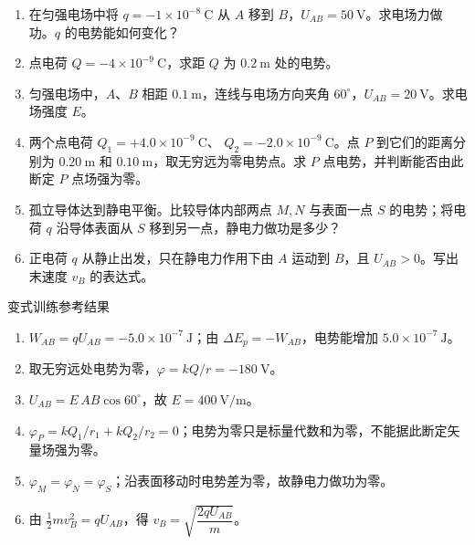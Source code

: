 \begin{enumerate}
  \item 在匀强电场中将 $q = -1 \times 10^{-8}\ \mathrm{C}$ 从 $A$ 移到 $B$，$U_{AB} = 50\ \mathrm{V}$。求电场力做功。$q$ 的电势能如何变化？

  \item 点电荷 $Q = -4 \times 10^{-9}\ \mathrm{C}$，求距 $Q$ 为 $0.2\ \mathrm{m}$ 处的电势。

  \item 匀强电场中，$A$、$B$ 相距 $0.1\ \mathrm{m}$，连线与电场方向夹角 $60^\circ$，$U_{AB} = 20\ \mathrm{V}$。求电场强度 $E$。
  \begin{center}
  
  \end{center}

  \item 两个点电荷 $Q_1=+4.0\times10^{-9}\ \mathrm C$、
  $Q_2=-2.0\times10^{-9}\ \mathrm C$。点 $P$ 到它们的距离分别为
  $0.20\ \mathrm m$ 和 $0.10\ \mathrm m$，取无穷远为零电势点。求
  $P$ 点电势，并判断能否由此断定 $P$ 点场强为零。

  \item 孤立导体达到静电平衡。比较导体内部两点 $M,N$ 与表面一点
  $S$ 的电势；将电荷 $q$ 沿导体表面从 $S$ 移到另一点，静电力做功是多少？

  \item 正电荷 $q$ 从静止出发，只在静电力作用下由 $A$ 运动到
  $B$，且 $U_{AB}>0$。写出末速度 $v_B$ 的表达式。
\end{enumerate}

\begin{learningbox}{变式训练参考结果}
\begin{enumerate}[itemsep=0.45em,topsep=0.3em,parsep=0pt]
  \item $W_{AB}=qU_{AB}=-5.0\times10^{-7}\ \mathrm J$；由
  $\Delta E_p=-W_{AB}$，电势能增加 $5.0\times10^{-7}\ \mathrm J$。
  \item 取无穷远处电势为零，$\varphi=kQ/r=-180\ \mathrm V$。
  \item $U_{AB}=E\,AB\cos60^\circ$，故 $E=400\ \mathrm{V/m}$。
  \item $\varphi_P=kQ_1/r_1+kQ_2/r_2=0$；电势为零只是标量代数和为零，不能据此断定矢量场强为零。
  \item $\varphi_M=\varphi_N=\varphi_S$；沿表面移动时电势差为零，故静电力做功为零。
  \item 由 $\frac12mv_B^2=qU_{AB}$，得
  $v_B=\sqrt{\dfrac{2qU_{AB}}{m}}$。
\end{enumerate}
\end{learningbox}

